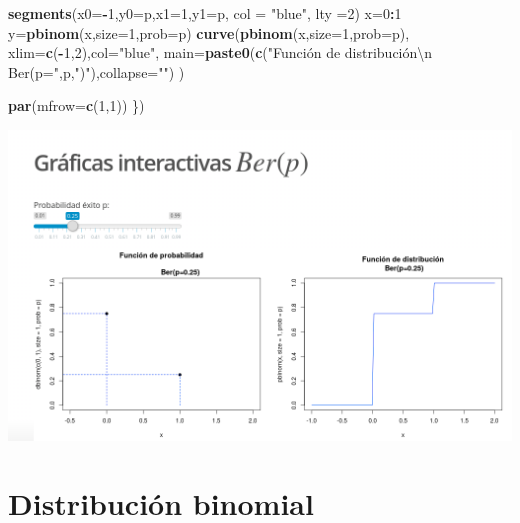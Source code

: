 \documentclass[]{book}
\newenvironment{Shaded}{\begin{snugshade}}{\end{snugshade}}
\newcommand{\DataTypeTok}[1]{\textcolor[rgb]{0.13,0.29,0.53}{#1}}
\newcommand{\DecValTok}[1]{\textcolor[rgb]{0.00,0.00,0.81}{#1}}
\newcommand{\KeywordTok}[1]{\textcolor[rgb]{0.13,0.29,0.53}{\textbf{#1}}}
\newcommand{\NormalTok}[1]{#1}
\newcommand{\OperatorTok}[1]{\textcolor[rgb]{0.81,0.36,0.00}{\textbf{#1}}}
\newcommand{\StringTok}[1]{\textcolor[rgb]{0.31,0.60,0.02}{#1}}
\begin{document}
\begin{Shaded}
\begin{Highlighting}[]
\KeywordTok{segments}\NormalTok{(}\DataTypeTok{x0=}\OperatorTok{-}\DecValTok{1}\NormalTok{,}\DataTypeTok{y0=}\NormalTok{p,}\DataTypeTok{x1=}\DecValTok{1}\NormalTok{,}\DataTypeTok{y1=}\NormalTok{p, }\DataTypeTok{col =} \StringTok{"blue"}\NormalTok{, }\DataTypeTok{lty =}\DecValTok{2}\NormalTok{)}
\NormalTok{x=}\DecValTok{0}\OperatorTok{:}\DecValTok{1}
\NormalTok{y=}\KeywordTok{pbinom}\NormalTok{(x,}\DataTypeTok{size=}\DecValTok{1}\NormalTok{,}\DataTypeTok{prob=}\NormalTok{p)}
\KeywordTok{curve}\NormalTok{(}\KeywordTok{pbinom}\NormalTok{(x,}\DataTypeTok{size=}\DecValTok{1}\NormalTok{,}\DataTypeTok{prob=}\NormalTok{p),}
      \DataTypeTok{xlim=}\KeywordTok{c}\NormalTok{(}\OperatorTok{-}\DecValTok{1}\NormalTok{,}\DecValTok{2}\NormalTok{),}\DataTypeTok{col=}\StringTok{"blue"}\NormalTok{,}
      \DataTypeTok{main=}\KeywordTok{paste0}\NormalTok{(}\KeywordTok{c}\NormalTok{(}\StringTok{"Función de distribución\textbackslash{}n Ber(p="}\NormalTok{,p,}\StringTok{")"}\NormalTok{),}\DataTypeTok{collapse=}\StringTok{""}\NormalTok{)}
\NormalTok{      )}

\KeywordTok{par}\NormalTok{(}\DataTypeTok{mfrow=}\KeywordTok{c}\NormalTok{(}\DecValTok{1}\NormalTok{,}\DecValTok{1}\NormalTok{))}
\NormalTok{\})}
\end{Highlighting}
\end{Shaded}

\href{https://github.com/joanby/probabilidad}{\includegraphics{Images/noshinyImages/interactiva_ber1.png}}

\hypertarget{distribuciuxf3n-binomial}{%
\section{Distribución binomial}\label{distribuciuxf3n-binomial}}
\end{document}
